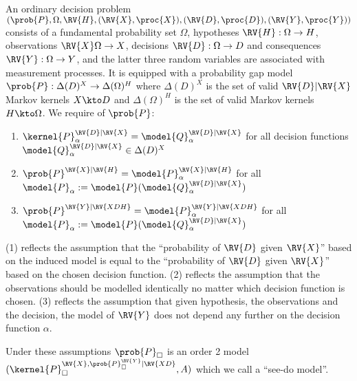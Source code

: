\begin{definition}
An ordinary decision problem $(\prob{P},\Omega,\RV{H},(\RV{X},\proc{X}),(\RV{D},\proc{D}),(\RV{Y},\proc{Y}))$ consists of a fundamental probability set $\Omega$, hypotheses $\RV{H}:\Omega\to H$, observations $\RV{X}\Omega\to X$, decisions $\RV{D}:\Omega\to D$ and consequences $\RV{Y}:\Omega\to Y$, and the latter three random variables are associated with measurement processes. It is equipped with a probability gap model $\prob{P}:\Delta(D)^X\to \Delta(\Omega)^H$ where $\Delta(D)^X$ is the set of valid $\RV{D}|\RV{X}$ Markov kernels $X\kto D$ and $\Delta(\Omega)^H$ is the set of valid Markov kernels $H\kto \Omega$. We require of $\prob{P}$:
\begin{enumerate}
    \item $\kernel{P}_\alpha^{\RV{D}|\RV{X}}=\model{Q}_\alpha^{\RV{D}|\RV{X}}$ for all decision functions $\model{Q}_\alpha^{\RV{D}|\RV{X}}\in \Delta(D)^X$
    \item $\prob{P}^{\RV{X}|\RV{H}}=\model{P}_\alpha^{\RV{X}|\RV{H}}$ for all $\model{P}_\alpha:=\model{P}(\model{Q}_\alpha^{\RV{D}|\RV{X}})$
    \item $\prob{P}^{\RV{Y}|\RV{XDH}}=\model{P}_\alpha^{\RV{Y}|\RV{XDH}}$ for all $\model{P}_\alpha:=\model{P}(\model{Q}_\alpha^{\RV{D}|\RV{X}})$
\end{enumerate}
\end{definition}

(1) reflects the assumption that the ``probability of $\RV{D}$ given $\RV{X}$'' based on the induced model is equal to the ``probability of $\RV{D}$ given $\RV{X}$'' based on the chosen decision function. (2) reflects the assumption that the observations should be modelled identically no matter which decision function is chosen. (3) reflects the assumption that given hypothesis, the observations and the decision, the model of $\RV{Y}$ does not depend any further on the decision function $\alpha$.

Under these assumptions $\prob{P}_\square$ is an order 2 model $(\kernel{P}_\square^{\RV{X},\prob{P}_\square^\RV{Y}|\RV{XD}},A)$ which we call a ``see-do model''.


